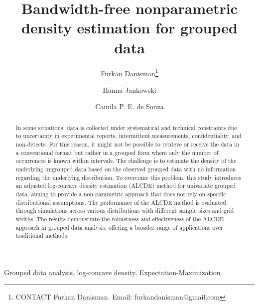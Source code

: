 \documentclass[12pt]{article} %
\title{Bandwidth-free nonparametric density estimation for grouped data}
\author[a,d]{Furkan Danisman\thanks{CONTACT Furkan Danisman. Email: furkandanisman@gmail.com}}
\author[b]{Hanna Jankowski}
\author[c]{Camila P. E. de Souza}
\affil[a]{University of Toronto, ON, Canada}
\affil[b]{York University, ON, Canada}
\affil[c]{Western University, ON, Canada}
\affil[d]{Vector Institute for Artificial Intelligence, Toronto, Canada}
\begin{document}
\maketitle


\begin{abstract}

In some situations, data is collected under systematical and technical constraints due to uncertainty in experimental reports, intermittent measurements, confidentiality, and non-detects. For this reason, it might not be possible to retrieve or receive the data in a conventional format but rather in a grouped form where only the number of occurrences is known within intervals. The challenge is to estimate the density of the underlying ungrouped data based on the observed grouped data with no information regarding the underlying distribution. To overcome this problem, this study introduces an adjusted log-concave density estimation (ALCDE) method for univariate grouped data, aiming to provide a non-parametric approach that does not rely on specific distributional assumptions. The performance of the ALCDE method is evaluated through simulations across various distributions with different sample sizes and grid widths. %
The results demonstrate the robustness and effectiveness of the ALCDE approach in grouped data analysis, offering a broader range of applications over traditional methods. 



\end{abstract}

\begin{keywords}
Grouped data analysis, log-concave density, Expectation-Maximization
\end{keywords}



\end{document}
